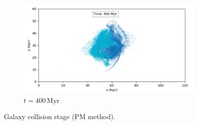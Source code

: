 \begin{figure}[H]
    \begin{subfigure}[b]{0.8\textwidth}
        \centering
        \includegraphics[width=\textwidth]{chapters/results/img/pm-collision/400myr.png}
        \caption{$t=400\,\text{Myr}$}
        \label{fig:collision-pm-sub3}
    \end{subfigure}

    \caption{Galaxy collision stage (PM method).}
    \label{fig:collision-pm}
\end{figure}